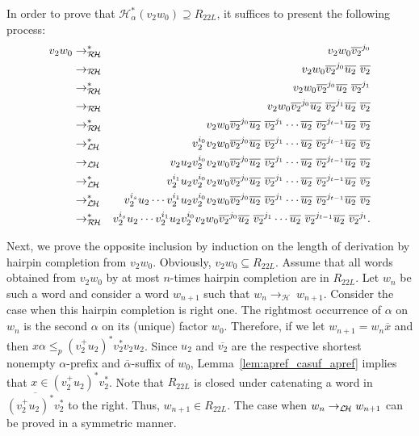 \documentclass{article}
\theoremstyle{plain}
\theoremstyle{remark}
\newcommand{\LHC}{\ensuremath{\mathcal{L\hspace*{-0.5mm}H}}}
\newcommand{\RHC}{\ensuremath{\mathcal{R\hspace*{-0.5mm}H}}}
\newcommand{\HC}{\ensuremath{\mathcal{H}}}
\newcommand{\calpha}{\ensuremath{\overline{\alpha}}}
\begin{document}
In order to prove that $\HC_\alpha^*(v_2 w_0) \supseteq R_{22L}$, it suffices to present the following process: 
\begin{eqnarray*}
	v_2 w_0 &\to_{\RHC}^*& 	v_2 w_0 \overline{v_2}^{j_0} \\
		&\to_{\RHC}& 	v_2 w_0 \overline{v_2}^{j_0} \overline{u_2} \ \overline{v_2} \\
		&\to_{\RHC}^*& 	v_2 w_0 \overline{v_2}^{j_0} \overline{u_2} \ \overline{v_2}^{j_1} \\ 
		&\to_{\RHC}& 	v_2 w_0 \overline{v_2}^{j_0} \overline{u_2} \ \overline{v_2}^{j_1} \overline{u_2} \ \overline{v_2} \\
		&\to_{\RHC}^*& 	v_2 w_0 \overline{v_2}^{j_0} \overline{u_2} \ \overline{v_2}^{j_1} \cdots \overline{u_2} \ \overline{v_2}^{j_{t-1}} \overline{u_2} \ \overline{v_2} \\
		&\to_{\LHC}^*& 	v_2^{i_0} v_2 w_0 \overline{v_2}^{j_0} \overline{u_2} \ \overline{v_2}^{j_1} \cdots \overline{u_2} \ \overline{v_2}^{j_{t-1}} \overline{u_2} \ \overline{v_2} \\ 
		&\to_{\LHC}& 	v_2 u_2 v_2^{i_0} v_2 w_0 \overline{v_2}^{j_0} \overline{u_2} \ \overline{v_2}^{j_1} \cdots \overline{u_2} \ \overline{v_2}^{j_{t-1}} \overline{u_2} \ \overline{v_2} \\
		&\to_{\LHC}^*& 	v_2^{i_1} u_2 v_2^{i_0} v_2 w_0 \overline{v_2}^{j_0} \overline{u_2} \ \overline{v_2}^{j_1} \cdots \overline{u_2} \ \overline{v_2}^{j_{t-1}} \overline{u_2} \ \overline{v_2} \\
		&\to_{\LHC}^*& 	v_2^{i_s} u_2 \cdots v_2^{i_1} u_2 v_2^{i_0} v_2 w_0 \overline{v_2}^{j_0} \overline{u_2} \ \overline{v_2}^{j_1} \cdots \overline{u_2} \ \overline{v_2}^{j_{t-1}} \overline{u_2} \ \overline{v_2} \\
		&\to_{\RHC}^*& 	v_2^{i_s} u_2 \cdots v_2^{i_1} u_2 v_2^{i_0} v_2 w_0 \overline{v_2}^{j_0} \overline{u_2} \ \overline{v_2}^{j_1} \cdots \overline{u_2} \ \overline{v_2}^{j_{t-1}} \overline{u_2} \ \overline{v_2}^{j_t}.
\end{eqnarray*}

Next, we prove the opposite inclusion by induction on the length of derivation by hairpin completion from $v_2 w_0$. 
Obviously, $v_2 w_0 \subseteq R_{22L}$. 
Assume that all words obtained from $v_2 w_0$ by at most $n$-times hairpin completion are in $R_{22L}$. 
Let $w_n$ be such a word and consider a word $w_{n+1}$ such that $w_n \to_{\HC}~w_{n+1}$. 
Consider the case when this hairpin completion is right one. 
The rightmost occurrence of $\alpha$ on $w_n$ is the second $\alpha$ on its (unique) factor $w_0$. 
Therefore, if we let $w_{n+1} = w_n \overline{x}$ and then $x \alpha \le_p (v_2^+ u_2)^*v_2^*v_2u_2$. 
Since $u_2$ and $\overline{v_2}$ are the respective shortest nonempty $\alpha$-prefix and $\calpha$-suffix of $w_0$, Lemma~\ref{lem:apref_casuf_apref} implies that $x \in (v_2^+ u_2)^* v_2^*$. 
Note that $R_{22L}$ is closed under catenating a word in $\overline{(v_2^+ u_2)^* v_2^*}$ to the right. 
Thus, $w_{n+1} \in R_{22L}$. 
The case when $w_n \to_{\LHC} w_{n+1}$ can be proved in a symmetric manner. 
\end{document}
